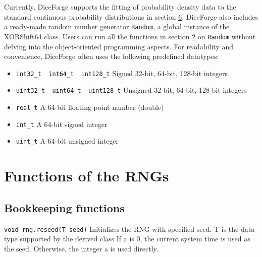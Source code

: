 \documentclass[titlepage, 11pt]{article}
\newcommand{\code}[1]
{\colorbox{light-gray}{\texttt{#1}}}
\begin{document}
\newline
\newline
Currently, DiceForge supports the fitting of probability density data to the standard continuous probability distributions in section \hyperref[sec:6]{6}.
\newline
\newline
DiceForge also includes a ready-made random number generator \code{Random}, a global instance of the XORShift64 class. Users can run all the functions in section \hyperref[sec:2]{2} on \code{Random} without delving into the object-oriented programming aspects. 
\newline
\newline
For readability and convenience, DiceForge often uses the following predefined datatypes:
\begin{itemize}
    \item 
    \code{int32\_t\, int64\_t\, int128\_t}
    Signed 32-bit, 64-bit, 128-bit integers
    
    \item 
    \code{uint32\_t\, uint64\_t\, uint128\_t}
    Unsigned 32-bit, 64-bit, 128-bit integers
    
    \item 
    \code{real\_t}
    A 64-bit floating point number (double)
    
    \item 
    \code{int\_t}
    A 64-bit signed integer
    
    \item 
    \code{uint\_t}
    A 64-bit unsigned integer 
\end{itemize}

\newpage
\section {Functions of the RNGs}
\label{sec:2}
\subsection{Bookkeeping functions}
\code{void rng.reseed(T seed)}
\newline
\newline
Initializes the RNG with specified seed.
\newline
T is the data type supported by the derived class
\newline
If a is 0, the current system time is used as the seed. Otherwise, the integer a is used directly.
\end{document}
